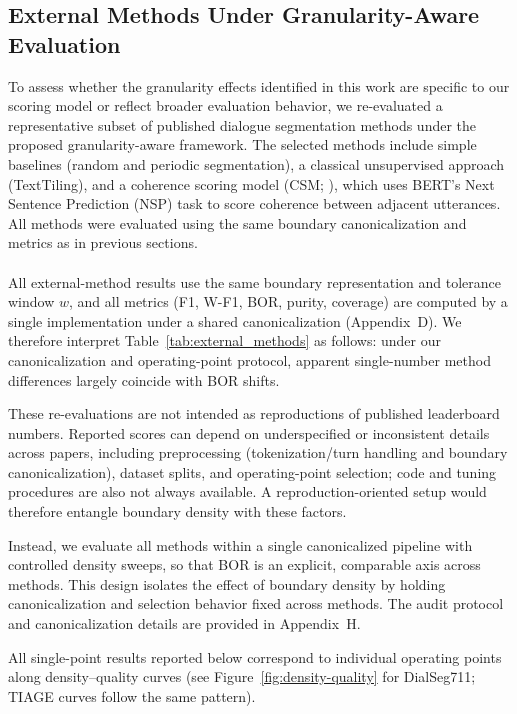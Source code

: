 \documentclass{article}
\makeatletter
\newcommand{\myparagraph}[1]{%
  \paragraph{\@addpunct{#1}}%
}
\makeatother
\begin{document}
\subsection{External Methods Under Granularity-Aware Evaluation}
To assess whether the granularity effects identified in this work are
specific to our scoring model or reflect broader evaluation behavior,
we re-evaluated a representative subset of published dialogue
segmentation methods under the proposed granularity-aware
framework. The selected methods include simple baselines (random and
periodic segmentation), a classical unsupervised approach
(TextTiling), and a coherence scoring model (CSM;
\citealt{xing2021improving}), which uses BERT's Next Sentence Prediction (NSP)
task to score coherence between adjacent utterances.  All methods were evaluated using the
same boundary canonicalization and metrics as in previous sections.

\myparagraph{External-method re-evaluations: scope and controls}
All external-method results use the same boundary representation and tolerance
window $w$, and all metrics (F1, W-F1, BOR, purity, coverage) are computed by a
single implementation under a shared canonicalization
(Appendix~D).
We therefore interpret
Table~\ref{tab:external_methods} as follows: under our canonicalization and
operating-point protocol, apparent single-number method differences largely
coincide with BOR shifts.

These re-evaluations are not intended as reproductions of published leaderboard
numbers. Reported scores can depend on underspecified or inconsistent details
across papers, including preprocessing (tokenization/turn handling and boundary
canonicalization), dataset splits, and operating-point selection; code and tuning
procedures are also not always available. A reproduction-oriented setup would
therefore entangle boundary density with these factors.

Instead, we evaluate all methods within a single canonicalized
pipeline with controlled density sweeps, so that BOR is an explicit,
comparable axis across methods. This design isolates the effect of
boundary density by holding canonicalization and selection behavior
fixed across methods. The audit protocol and canonicalization details
are provided in Appendix~H.

All single-point results reported below correspond to individual operating points
along density--quality curves (see Figure~\ref{fig:density-quality} for DialSeg711; TIAGE curves follow the same pattern).
\end{document}
